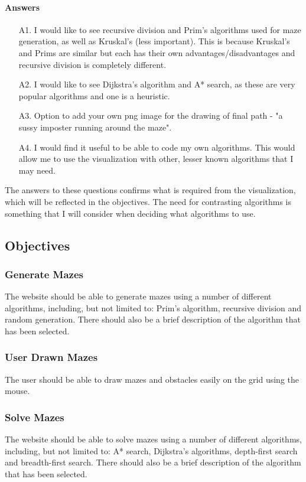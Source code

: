 \documentclass{article}
\begin{document}
\paragraph*{Answers}
\begin{enumerate}
    \item[A1.]I would like to see recursive division and Prim's algorithms used for maze generation, as well as Kruskal's (less important). This is because Kruskal's and Prims are similar but each has their own advantages/disadvantages and recursive division is completely different.
    \item[A2.]I would like to see Dijkstra's algorithm and A* search, as these are very popular algorithms and one is a heuristic.
    \item[A3.]Option to add your own png image for the drawing of final path - "a sussy imposter running around the maze".
    \item[A4.]I would find it useful to be able to code my own algorithms. This would allow me to use the visualization with other, lesser known algorithms that I may need.
\end{enumerate}
The answers to these questions confirms what is required from the visualization, which will be reflected in the objectives. The need for contrasting algorithms is something that I will consider when deciding what algorithms to use.
\subsection{Objectives}
\subsubsection{Generate Mazes}
The website should be able to generate mazes using a number of different algorithms, including, but not limited to: Prim's algorithm, recursive division and random generation. There should also be a brief description of the algorithm that has been selected.

\subsubsection{User Drawn Mazes}
The user should be able to draw mazes and obstacles easily on the grid using the mouse.

\subsubsection{Solve Mazes}
The website should be able to solve mazes using a number of different algorithms, including, but not limited to: A* search, Dijkstra's algorithms, depth-first search and breadth-first search. There should also be a brief description of the algorithm that has been selected.
\end{document}
